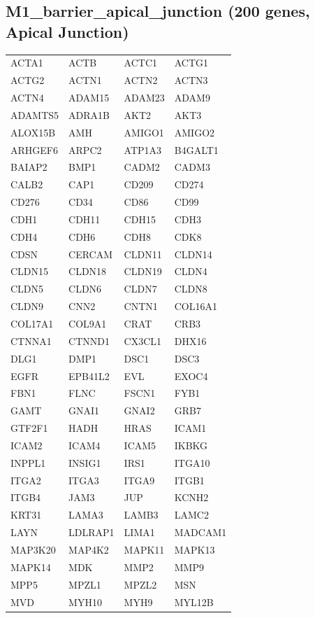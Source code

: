 \subsection*{M1\_barrier\_apical\_junction (200 genes, Apical Junction)}
\begin{longtable}{llll}
ACTA1 & ACTB & ACTC1 & ACTG1 \\
ACTG2 & ACTN1 & ACTN2 & ACTN3 \\
ACTN4 & ADAM15 & ADAM23 & ADAM9 \\
ADAMTS5 & ADRA1B & AKT2 & AKT3 \\
ALOX15B & AMH & AMIGO1 & AMIGO2 \\
ARHGEF6 & ARPC2 & ATP1A3 & B4GALT1 \\
BAIAP2 & BMP1 & CADM2 & CADM3 \\
CALB2 & CAP1 & CD209 & CD274 \\
CD276 & CD34 & CD86 & CD99 \\
CDH1 & CDH11 & CDH15 & CDH3 \\
CDH4 & CDH6 & CDH8 & CDK8 \\
CDSN & CERCAM & CLDN11 & CLDN14 \\
CLDN15 & CLDN18 & CLDN19 & CLDN4 \\
CLDN5 & CLDN6 & CLDN7 & CLDN8 \\
CLDN9 & CNN2 & CNTN1 & COL16A1 \\
COL17A1 & COL9A1 & CRAT & CRB3 \\
CTNNA1 & CTNND1 & CX3CL1 & DHX16 \\
DLG1 & DMP1 & DSC1 & DSC3 \\
EGFR & EPB41L2 & EVL & EXOC4 \\
FBN1 & FLNC & FSCN1 & FYB1 \\
GAMT & GNAI1 & GNAI2 & GRB7 \\
GTF2F1 & HADH & HRAS & ICAM1 \\
ICAM2 & ICAM4 & ICAM5 & IKBKG \\
INPPL1 & INSIG1 & IRS1 & ITGA10 \\
ITGA2 & ITGA3 & ITGA9 & ITGB1 \\
ITGB4 & JAM3 & JUP & KCNH2 \\
KRT31 & LAMA3 & LAMB3 & LAMC2 \\
LAYN & LDLRAP1 & LIMA1 & MADCAM1 \\
MAP3K20 & MAP4K2 & MAPK11 & MAPK13 \\
MAPK14 & MDK & MMP2 & MMP9 \\
MPP5 & MPZL1 & MPZL2 & MSN \\
MVD & MYH10 & MYH9 & MYL12B \\

\end{longtable}
